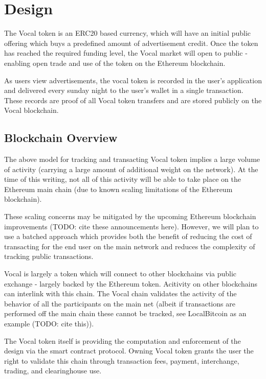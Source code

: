\documentclass[conference]{IEEEtran}
\begin{document}
    \section{Design}

    The Vocal token is an ERC20 based currency, which will have an initial public offering which buys a predefined amount of advertisement credit. Once the token has reached the required funding level, the Vocal market will open to public - enabling open trade and use of the token on the Ethereum blockchain.

    As users view advertisements, the vocal token is recorded in the user's application and delivered every sunday night to the user's wallet in a single transaction. 
    These records are proof of all Vocal token transfers and are stored publicly on the Vocal blockchain. 


    \subsection{Blockchain Overview}

    The above model for tracking and transacting Vocal token implies a large volume of activity (carrying a large amount of additional weight on the network). At the time of this writing, not all of this activity will be able to take place on the Ethereum main chain (due to known scaling limitations of the Ethereum blockchain).


    These scaling concerns may be mitigated by the upcoming Ethereum blockchain improvements (TODO: cite these announcements here). However, we will plan to use a batched approach which provides both the benefit of reducing the cost of transacting for the end user on the main network and reduces the complexity of tracking public transactions.

    Vocal is largely a token which will connect to other blockchains via public exchange - largely backed by the Ethereum token. Acitivity on other blockchains can interlink with this chain. The Vocal chain validates the activity of the behavior of all the participants on the main net (albeit if transactions are performed off the main chain these cannot be tracked, see LocalBitcoin as an example (TODO: cite this)).

    The Vocal token itself is providing the computation and enforcement of the design via the smart contract protocol. Owning Vocal token grants the user the right to validate this chain through transaction fees, payment, interchange, trading, and clearinghouse use. 
\end{document}
